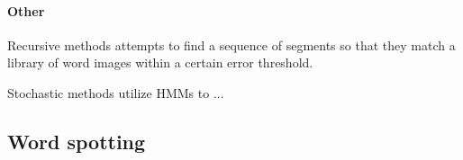 \paragraph{Other}

Recursive methods attempts to find a sequence of segments so that they match a library of word images within a certain error threshold.

Stochastic methods utilize HMMs to ...



\subsection{Word spotting}

